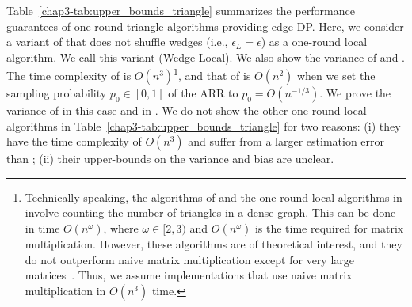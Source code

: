 Table~\ref{chap3-tab:upper_bounds_triangle} summarizes the
performance guarantees
of one-round triangle algorithms providing edge DP.
Here,
we consider a variant of \AlgWSTri{} that does not shuffle wedges (i.e., $\epsilon_L = \epsilon$) as a one-round local algorithm.
We call this variant \AlgWLTri{} (Wedge Local).
We also show the variance of \AlgARRTri{} \cite{Imola_USENIX22} and \AlgRRTri{} \cite{Imola_USENIX21}.
The time complexity of \AlgRRTri{} is $O(n^3)$\footnote{Technically speaking, the algorithms of \AlgRRTri{} and
the one-round local algorithms in \cite{Ye_ICDE20,Ye_TKDE21} involve counting the number of triangles in a dense
graph. This can be done in time $O(n^\omega)$, where $\omega \in [2,3)$ and $O(n^\omega)$ is the time required for matrix multiplication. However, these algorithms are of theoretical interest,
and they do not outperform naive matrix multiplication except
for very large matrices~\cite{Alman_2021}. Thus, we assume implementations that use naive matrix multiplication in
$O(n^3)$ time.}, and that
of \AlgARRTri{} is $O(n^2)$ when we set the sampling probability $p_0 \in [0,1]$ of the ARR to $p_0=O(n^{-1/3})$.
We prove the variance of \AlgARRTri{} in this case and \AlgRRTri{}
in .
We do not show the other one-round local algorithms \cite{Ye_ICDE20,Ye_TKDE21} in Table~\ref{chap3-tab:upper_bounds_triangle} for two reasons: (i) they have the time complexity of $O(n^3)$ and suffer from a larger estimation error than \AlgRRTri{} \cite{Imola_USENIX22};
(ii) their upper-bounds on the variance and bias are unclear.

